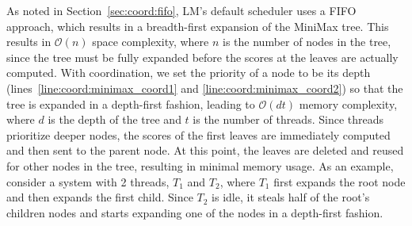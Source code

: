 As noted in Section~\ref{sec:coord:fifo}, LM's default scheduler uses a FIFO
approach, which results in a breadth-first expansion of the MiniMax tree. This
results in $\mathcal{O}(n)$ space complexity, where $n$ is the number of nodes
in the tree, since the tree must be fully expanded before the scores at the
leaves are actually computed.  With coordination, we set the priority of a node
to be its depth (lines~\ref{line:coord:minimax_coord1} and
\ref{line:coord:minimax_coord2}) so that the tree is expanded in a depth-first
fashion, leading to $\mathcal{O}(d t)$ memory complexity, where $d$ is the depth
of the tree and $t$ is the number of threads. Since threads prioritize deeper
nodes, the scores of the first leaves are immediately computed and then sent to
the parent node. At this point, the leaves are deleted and reused for other
nodes in the tree, resulting in minimal memory usage.  As an example, consider a
system with 2 threads, $T_1$ and $T_2$, where $T_1$ first expands the root node
and then expands the first child. Since $T_2$ is idle, it steals half of the root's
children nodes and starts expanding one of the nodes in a depth-first fashion.

